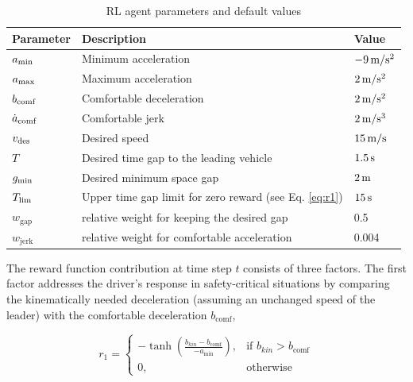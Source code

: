 \documentclass[review]{elsarticle}
\providecommand{\sub}[1]{_{\mathrm{#1}}}  %
\providecommand{\3}{{\ss}}
\begin{document}
\begin{table}
	\caption{RL agent parameters and default values} 
	\label{tab:agentParameters} 
	\begin{center}
		\begin{tabular}{ p{}| p{}| p{}}
			Parameter & Description & Value \\ \hline
			$a\sub{\rm min}$ & Minimum acceleration & $\unit[-9]{m/s^2}$ \\  
			$a_{\rm max}$ & Maximum acceleration & $\unit[2]{m/s^2}$ \\  
			$b_{\rm comf}$ & Comfortable deceleration & $\unit[2]{m/s^2}$ \\  
			$\dot{a}_{\rm comf}$ & Comfortable jerk & $\unit[2]{m/s^3}$ \\  
			$v_{\rm des}$ & Desired speed & $\unit[15]{ m/s}$ \\  		
			$T$ & Desired time gap to the leading vehicle & $\unit[1.5]{s}$ \\
			$g_{\rm min}$ & Desired minimum space gap & $\unit[2]{m}$ \\
			$T_{\rm lim}$ & Upper time gap limit for zero reward (see
			Eq. \eqref{eq:r1}) & $\unit[15]{s}$ \\
			$w\sub{gap}$ & relative weight for keeping the desired gap & 0.5\\
			$w\sub{jerk}$ & relative weight for comfortable acceleration & 0.004\\
		\end{tabular}
	\end{center}
\end{table}



The reward function contribution at time step $t$ consists of three factors. 
The first factor addresses the driver's
response in safety-critical situations by comparing the
kinematically needed deceleration (assuming an
unchanged speed of the leader) with the
comfortable deceleration $b\sub{comf}$,



\begin{equation}
\label{eq:r1_CFP}
r_1 = 
\begin{cases}
-\tanh\left(\frac{b_{kin}-b\sub{comf}}{-a\sub{min}}\right),& \text{if } b_{kin}>b\sub{comf}\\
0,              & \text{otherwise}
\end{cases}
\end{equation}
\end{document}
